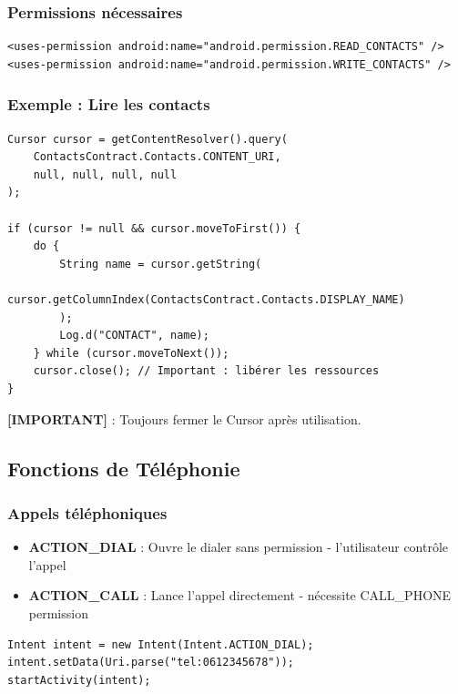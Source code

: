 \documentclass[11pt,a4paper]{article}
\begin{document}
\subsubsection{Permissions nécessaires}

\begin{lstlisting}[style=XML]
<uses-permission android:name="android.permission.READ_CONTACTS" />
<uses-permission android:name="android.permission.WRITE_CONTACTS" />
\end{lstlisting}

\subsubsection{Exemple : Lire les contacts}

\begin{lstlisting}
Cursor cursor = getContentResolver().query(
    ContactsContract.Contacts.CONTENT_URI,
    null, null, null, null
);

if (cursor != null && cursor.moveToFirst()) {
    do {
        String name = cursor.getString(
            cursor.getColumnIndex(ContactsContract.Contacts.DISPLAY_NAME)
        );
        Log.d("CONTACT", name);
    } while (cursor.moveToNext());
    cursor.close(); // Important : libérer les ressources
}
\end{lstlisting}

\textbf{[IMPORTANT]} : Toujours fermer le Cursor après utilisation.

\subsection{Fonctions de Téléphonie}

\subsubsection{Appels téléphoniques}

\begin{itemize}
    \item \textbf{ACTION\_DIAL} : Ouvre le dialer sans permission - l'utilisateur contrôle l'appel
    \item \textbf{ACTION\_CALL} : Lance l'appel directement - nécessite CALL\_PHONE permission
\end{itemize}

\begin{lstlisting}
Intent intent = new Intent(Intent.ACTION_DIAL);
intent.setData(Uri.parse("tel:0612345678"));
startActivity(intent);
\end{lstlisting}
\end{document}
